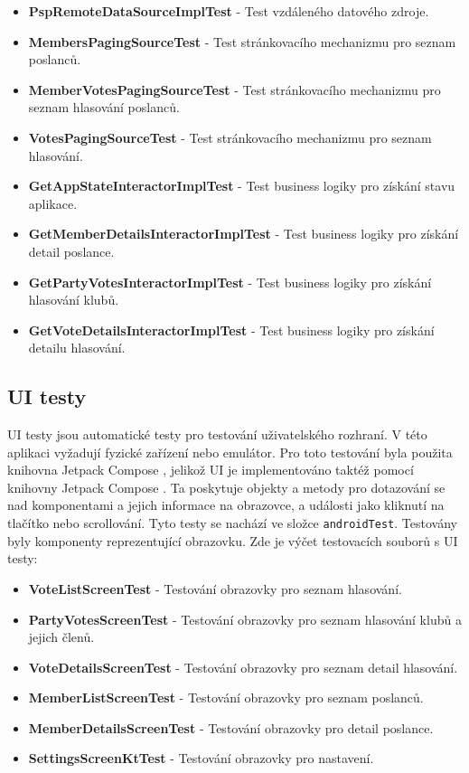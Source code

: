 \begin{itemize}
	\item \textbf{PspRemoteDataSourceImplTest} - Test vzdáleného datového zdroje.
	\item \textbf{MembersPagingSourceTest} - Test stránkovacího mechanizmu pro seznam poslanců.
	\item \textbf{MemberVotesPagingSourceTest} - Test stránkovacího mechanizmu pro seznam hlasování poslanců.
	\item \textbf{VotesPagingSourceTest} - Test stránkovacího mechanizmu pro seznam hlasování.
	\item \textbf{GetAppStateInteractorImplTest} - Test business logiky pro získání stavu aplikace.
	\item \textbf{GetMemberDetailsInteractorImplTest} - Test business logiky pro získání detail poslance.
	\item \textbf{GetPartyVotesInteractorImplTest} - Test business logiky pro získání hlasování klubů.
	\item \textbf{GetVoteDetailsInteractorImplTest} - Test business logiky pro získání detailu hlasování.
\end{itemize}

\subsection{UI testy}
UI testy jsou automatické testy pro testování uživatelského rozhraní. V této aplikaci vyžadují fyzické zařízení nebo emulátor. Pro toto testování byla použita knihovna Jetpack Compose , jelikož UI je implementováno taktéž pomocí knihovny Jetpack Compose \cite{compose-test}. Ta poskytuje objekty a metody pro dotazování se nad komponentami a jejich informace na obrazovce, a události jako kliknutí na tlačítko nebo scrollování. Tyto testy se nachází ve složce \texttt{androidTest}. Testovány byly komponenty reprezentující obrazovku. Zde je výčet testovacích souborů s UI testy:

\begin{itemize}
	\item \textbf{VoteListScreenTest} - Testování obrazovky pro seznam hlasování.
	\item \textbf{PartyVotesScreenTest} - Testování obrazovky pro seznam hlasování klubů a jejich členů.
	\item \textbf{VoteDetailsScreenTest} - Testování obrazovky pro seznam detail hlasování.
	\item \textbf{MemberListScreenTest} - Testování obrazovky pro seznam poslanců.
	\item \textbf{MemberDetailsScreenTest} - Testování obrazovky pro detail poslance.
	\item \textbf{SettingsScreenKtTest} - Testování obrazovky pro nastavení.
\end{itemize}

